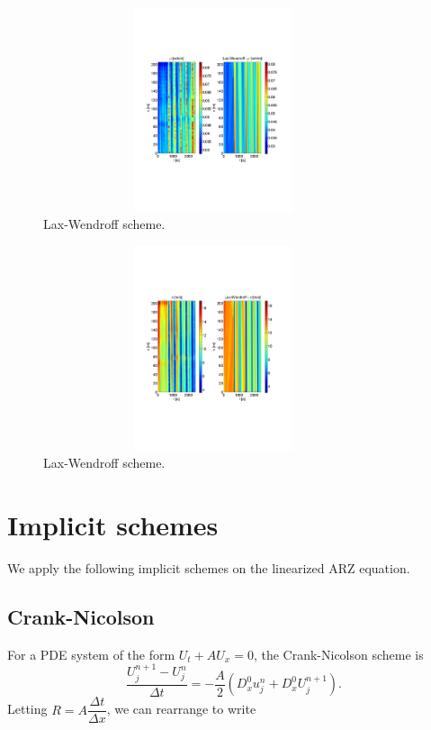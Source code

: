 \documentclass[letterpaper]{article}
\begin{document}
\begin{figure}[H]
\centering
\includegraphics[trim = 20mm 75mm 20mm 75mm, width = 100mm, height = 60mm]{LWrho.pdf}
\caption{Lax-Wendroff scheme.}
\label{fig:LWrho}
\end{figure}

\begin{figure}[H]
\centering
\includegraphics[trim = 20mm 75mm 20mm 75mm, width = 100mm, height = 60mm]{LWv.pdf}
\caption{Lax-Wendroff scheme.}
\label{fig:LWv}
\end{figure}

\section{Implicit schemes}

We apply the following implicit schemes on the linearized ARZ equation. 

\subsection{Crank-Nicolson}

For a PDE system of the form $U_t + A U_x = 0$, the Crank-Nicolson scheme is
\begin{equation}
\dfrac{U_j^{n+1} - U^n_j}{\Delta t} = -\dfrac{A}{2} (D^0_x u^n_j + D^0_x U^{n+1}_j).
\end{equation}
Letting $R = A \dfrac{\Delta t}{\Delta x}$, we can rearrange to write
\end{document}
